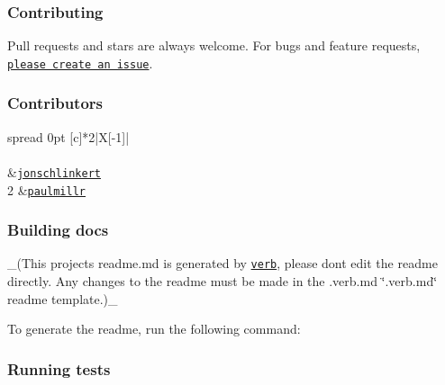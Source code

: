 \subsubsection*{Contributing}

Pull requests and stars are always welcome. For bugs and feature requests, \href{../../issues/new}{\tt please create an issue}.

\subsubsection*{Contributors}

\tabulinesep=1mm
\begin{longtabu} spread 0pt [c]{*{2}{|X[-1]}|}
\hline
\rowcolor{\tableheadbgcolor}\\
\endfirsthead
\hline
\endfoot
\hline
\rowcolor{\tableheadbgcolor}\\
  &\href{https://github.com/jonschlinkert}{\tt jonschlinkert}   \\
2  &\href{https://github.com/paulmillr}{\tt paulmillr}   \\
\end{longtabu}


\subsubsection*{Building docs}

\+\_\+(This project\textquotesingle{}s readme.\+md is generated by \href{https://github.com/verbose/verb-generate-readme}{\tt verb}, please don\textquotesingle{}t edit the readme directly. Any changes to the readme must be made in the .verb.\+md \char`\"{}.\+verb.\+md\char`\"{} readme template.)\+\_\+

To generate the readme, run the following command\+:




\subsubsection*{Running tests}

